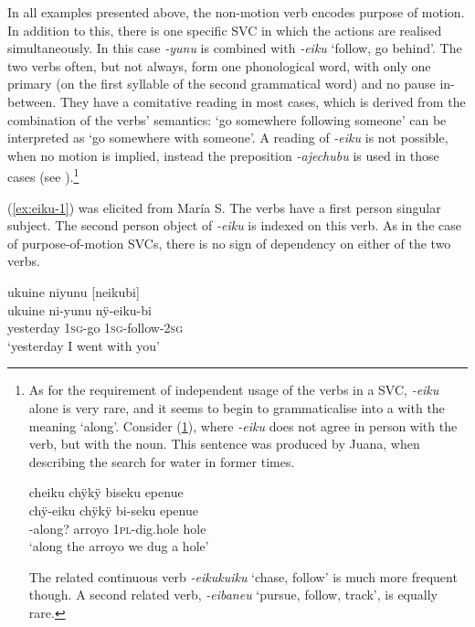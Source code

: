 In all examples presented above, the non-motion verb encodes purpose of motion. In addition to this, there is one specific SVC in which the actions are realised simultaneously. In this case \textit{-yunu} is combined with \textit{-eiku} ‘follow, go behind’. The two verbs often, but not always, form one phonological word, with only one primary  (on the first syllable of the second grammatical word) and no pause in-between. They have a comitative reading in most cases, which is derived from the combination of the verbs’ semantics: ‘go somewhere following someone’ can be interpreted as ‘go somewhere with someone’. A  reading of \textit{-eiku} is not possible, when no motion is implied, instead the preposition \textit{-ajechubu} is used in those cases (see ).\footnote{\label{fn:along}As for the requirement of independent usage of the verbs in a SVC, \textit{-eiku} alone is very rare, and it seems to begin to grammaticalise into a  with the meaning ‘along’. 
Consider (\ref{ex:tras}), where \textit{-eiku} does not agree in person with the verb, but with the noun. This sentence was produced by Juana, when describing the search for water in former times.

\ea\label{ex:tras}
\begingl
\glpreamble cheiku chÿkÿ biseku epenue\\
\gla chÿ-eiku chÿkÿ bi-seku epenue\\
-along? arroyo 1\textsc{pl}-dig.hole hole\\
\glft ‘along the arroyo we dug a hole’
\endgl
\trailingcitation{[jxx-p120515l-2.011]}
\xe

The related continuous verb \textit{-eikukuiku} ‘chase, follow’ is much more frequent though. A second related verb, \textit{-eibaneu} ‘pursue, follow, track’, is equally rare.\label{fn:eiku-adposition}}

(\ref{ex:eiku-1}) was elicited from María S. The verbs have a first person singular subject. The second person object of \textit{-eiku} is indexed on this verb. As in the case of purpose-of-motion SVCs, there is no sign of dependency on either of the two verbs.

\ea\label{ex:eiku-1}
\begingl
\glpreamble ukuine niyunu \textup{[}neikubi\textup{]}\\
\gla ukuine ni-yunu nÿ-eiku-bi\\
\glb yesterday 1\textsc{sg}-go 1\textsc{sg}-follow-2\textsc{sg}\\
\glft ‘yesterday I went with you’
\endgl
\trailingcitation{[rxx-e181031l-1]}
\xe

